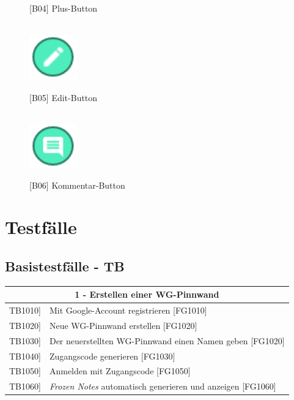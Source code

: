 \documentclass[a4paper]{scrreprt}
\begin{document}
\begin{figure}[h!]
\begin{minipage}[t]{0.45\linewidth}
    			\caption{{[}B04{]} Plus-Button}
    			\label{fig:figure1}
    			\hfill \\
    			\includegraphics[width=0.05\textheight]{edit_button.PNG}
    			\caption{{[}B05{]} Edit-Button}
    			\label{fig:figure1}
    			\hfill \\
    			\includegraphics[width=0.05\textheight]{comment_button.PNG}
    			\caption{{[}B06{]} Kommentar-Button}
    			\label{fig:figure1}	
    				
    			\end{minipage}
    		\end{figure}
    
    	\clearpage

    \chapter{Testfälle}
    
    	\section{Basistestfälle - TB}    
    	
	    \begin{table}[h!]
	    	\centering
	    	\label{my-label}
	    	\begin{tabular}{p{2cm}p{12cm}}
	    		
	    		\multicolumn{2}{c}{\textbf{1 - Erstellen einer WG-Pinnwand}} \\ \hline
	    		\centering{[}TB1010{]} & Mit Google-Account registrieren {[}FG1010{]}\\
	    		\centering{[}TB1020{]}& Neue WG-Pinnwand erstellen {[}FG1020{]}                                \\
	    		\centering{[}TB1030{]} & Der neuerstellten WG-Pinnwand einen Namen geben {[}FG1020{]} \\ 
	    		\centering{[}TB1040{]}& Zugangscode generieren {[}FG1030{]}\\ 
	    		\centering{[}TB1050{]}& Anmelden mit Zugangscode {[}FG1050{]}\\ 
	    		\centering{[}TB1060{]}& \textit{Frozen Notes} automatisch generieren und anzeigen {[}FG1060{]}\\ 
	    		\hline
	    	\end{tabular}
	    \end{table}
	    
\end{document}
